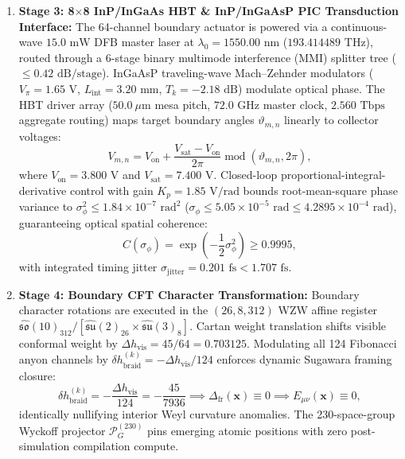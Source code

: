 \documentclass[11pt,onecolumn]{article}
\begin{document}
\begin{enumerate}
    \item \textbf{Stage 3: 8$\times$8 InP/InGaAs HBT \& InP/InGaAsP PIC Transduction Interface:}
    The 64-channel boundary actuator is powered via a continuous-wave $15.0\text{ mW}$ DFB master laser at $\lambda_0 = 1550.00\text{ nm}$ ($193.414489\text{ THz}$), routed through a 6-stage binary multimode interference (MMI) splitter tree ($\le 0.42\text{ dB/stage}$). InGaAsP traveling-wave Mach--Zehnder modulators ($V_\pi = 1.65\text{ V}$, $L_{\text{int}} = 3.20\text{ mm}$, $T_k = -2.18\text{ dB}$) modulate optical phase. The HBT driver array ($50.0\ \mu\text{m}$ mesa pitch, $72.0\text{ GHz}$ master clock, $2.560\text{ Tbps}$ aggregate routing) maps target boundary angles $\vartheta_{m,n}$ linearly to collector voltages:
    \begin{equation}
        V_{m,n} = V_{\text{on}} + \frac{V_{\text{sat}} - V_{\text{on}}}{2\pi} \operatorname{mod}(\vartheta_{m,n}, 2\pi),
        \label{eq:sim_hbt_bias}
    \end{equation}
    where $V_{\text{on}} = 3.800\text{ V}$ and $V_{\text{sat}} = 7.400\text{ V}$. Closed-loop proportional-integral-derivative control with gain $K_p = 1.85\text{ V/rad}$ bounds root-mean-square phase variance to $\sigma_\phi^2 \le 1.84 \times 10^{-7}\text{ rad}^2$ ($\sigma_\phi \le 5.05 \times 10^{-5}\text{ rad} \le 4.2895 \times 10^{-4}\text{ rad}$), guaranteeing optical spatial coherence:
    \begin{equation}
        C(\sigma_\phi) = \exp\left(-\frac{1}{2}\sigma_\phi^2\right) \ge 0.9995,
        \label{eq:sim_coherence}
    \end{equation}
    with integrated timing jitter $\sigma_{\text{jitter}} = 0.201\text{ fs} < 1.707\text{ fs}$.

    \item \textbf{Stage 4: Boundary CFT Character Transformation:}
    Boundary character rotations are executed in the $(26, 8, 312)$ WZW affine register $\widehat{\mathfrak{so}}(10)_{312} / [\widehat{\mathfrak{su}}(2)_{26} \times \widehat{\mathfrak{su}}(3)_8]$. Cartan weight translation shifts visible conformal weight by $\Delta h_{\text{vis}} = 45/64 = 0.703125$. Modulating all 124 Fibonacci anyon channels by $\delta h_{\text{braid}}^{(k)} = -\Delta h_{\text{vis}} / 124$ enforces dynamic Sugawara framing closure:
    \begin{equation}
        \delta h_{\text{braid}}^{(k)} = -\frac{\Delta h_{\text{vis}}}{124} = -\frac{45}{7936} \implies \Delta_{\text{fr}}(\mathbf{x}) \equiv 0 \implies E_{\mu\nu}(\mathbf{x}) \equiv 0,
        \label{eq:sim_sugawara}
    \end{equation}
    identically nullifying interior Weyl curvature anomalies. The 230-space-group Wyckoff projector $\mathcal{P}_G^{(230)}$ pins emerging atomic positions with zero post-simulation compilation compute.


\end{enumerate}
\end{document}
